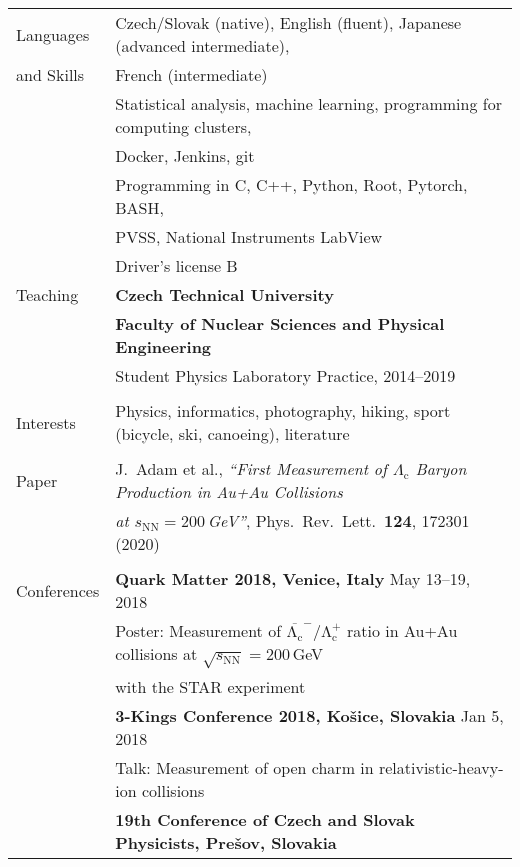 \documentclass[a4paper,11pt,oneside]{article}
\begin{document}
\newpage

\noindent  \begin{tabular}{@{} l l}
  \Large{Languages}   & Czech/Slovak (native), English (fluent), Japanese (advanced intermediate), \\
\Large{and Skills}    & French (intermediate)  \\[.2cm]
     & Statistical analysis, machine learning, programming for computing clusters, \\
     & Docker, Jenkins, git\\[.2cm]
     & Programming in C, C++, Python, Root, Pytorch, BASH,  \\
     & PVSS, National Instruments LabView \\[.2cm]
     & Driver's license B\\[.3cm]
  \Large{Teaching}  & \textbf{Czech Technical University} \\
     & \textbf{Faculty of Nuclear Sciences and Physical Engineering} \\
     & Student Physics Laboratory Practice, 2014--2019\\
     \\
\Large{Interests}    
     & Physics, informatics, photography, hiking, sport (bicycle, ski, canoeing), literature \\
     \\
\Large{Paper}
     & J.\ Adam et al., \emph{``First Measurement of $\Lambda_\mathrm{c}$ Baryon Production in Au+Au Collisions} \\
     & \emph{at $s_\mathrm{NN} = 200\,$GeV''}, Phys.\ Rev.\ Lett.\ \textbf{124}, 172301 (2020) \\
     \\
\Large{Conferences}
     & \textbf{Quark Matter 2018, Venice, Italy} May 13--19, 2018 \\
     & Poster: Measurement of $\mathrm{\overline{\Lambda_c}^-/\Lambda_c^+}$ ratio in Au+Au collisions at $\sqrt{s_\mathrm{NN}} = 200\,$GeV\\
     &with the STAR experiment \\[.2cm]
     & \textbf{3-Kings Conference 2018, Košice, Slovakia} Jan 5, 2018 \\
     & Talk: Measurement of open charm in relativistic-heavy-ion collisions \\[.2cm]
     & \textbf{19th Conference of Czech and Slovak Physicists, Prešov, Slovakia}\\

\end{tabular}
\end{document}
